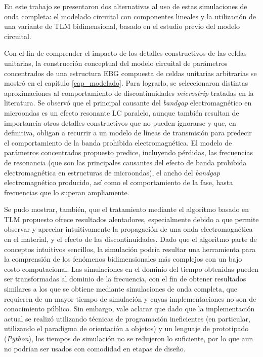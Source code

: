 En este trabajo se presentaron dos alternativas al uso de estas simulaciones de onda completa: el modelado circuital con componentes lineales y la utilización de una variante de TLM bidimensional, basado en el estudio previo del modelo circuital.

Con el fin de comprender el impacto de los detalles constructivos de las celdas unitarias, la construcción conceptual del modelo circuital de parámetros concentrados de una estructura EBG compuesta de celdas unitarias arbitrarias se mostró en el capítulo \ref{cap_modelado}. Para lograrlo, se seleccionaron distintas aproximaciones al comportamiento de discontinuidades \textit{microstrip} tratadas en la literatura. Se observó que el principal causante del \textit{bandgap} electromagnético en microondas es un efecto resonante LC paralelo, aunque también resultan de importancia otros detalles constructivos que no pueden ignorarse y que, en definitiva, obligan a recurrir a un modelo de líneas de transmisión para predecir el comportamiento de la banda prohibida electromagnética. El modelo de parámetros concentrados propuesto predice, incluyendo pérdidas, las frecuencias de resonancia (que son las principales causantes del efecto de banda prohibida electromagnética en estructuras de microondas), el ancho del \textit{bandgap} electromagnético producido, así como el comportamiento de la fase, hasta frecuencias que lo superan ampliamente.

Se pudo mostrar, también, que el tratamiento mediante el algoritmo basado en TLM propuesto ofrece resultados alentadores, especialmente debido a que permite observar y apreciar intuitivamente la propagación de una onda electromagnética en el material, y el efecto de las discontinuidades. Dado que el algoritmo parte de conceptos intuitivos sencillos, la simulación podría resultar una herramienta para la comprensión de los fenómenos bidimensionales más complejos con un bajo costo computacional. Las simulaciones en el dominio del tiempo obtenidas pueden ser transformadas al dominio de la frecuencia, con el fin de obtener resultados similares a los que se obtiene mediante simulaciones de onda completa, que requieren de un mayor tiempo de simulación y cuyas implementaciones no son de conocimiento público. Sin embargo, vale aclarar que dado que la implementación actual se realizó utilizando técnicas de programación ineficientes (en particular, utilizando el paradigma de orientación a objetos) y un lenguaje de prototipado (\textit{Python}), los tiempos de simulación no se redujeron lo suficiente, por lo que aun no podrían ser usados con comodidad en etapas de diseño.


